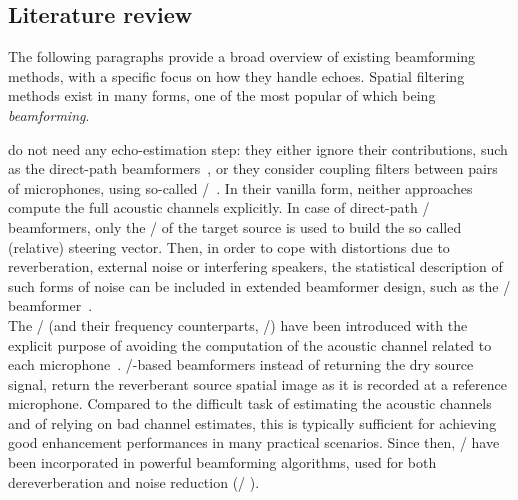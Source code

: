 \subsection{Literature review}
The following paragraphs provide a broad overview of existing beamforming methods, with a specific focus on how they handle echoes.
Spatial filtering methods exist in many forms, one of the most popular of which being \textit{beamforming}.

 do not need any echo-estimation step:
they either ignore their contributions, such as the direct-path beamformers~, or they consider coupling filters between pairs of microphones, using so-called \ReIRdef/~.
In their vanilla form, neither approaches compute the full acoustic channels explicitly.
In case of direct-path \DStxtdef/ beamformers, only the \DOA/ of the target source is used to build the so called (relative) steering vector.
Then, in order to cope with distortions due to reverberation, external noise or interfering speakers, the statistical description of such forms of noise can be included in extended beamformer design, such as the \MVDRtxt/ beamformer~.
\\The \ReIRs/ (and their frequency counterparts, \ReTFs/) have been introduced with the explicit purpose of avoiding the computation of the acoustic channel related to each microphone~.
\ReIRs/-based beamformers instead of returning the dry source signal, return the reverberant source spatial image as it is recorded at a reference microphone.
Compared to the difficult task of estimating the acoustic channels and of relying on bad channel estimates, this is typically sufficient for achieving good enhancement performances in many practical scenarios.
Since then, \ReIRs/ have been incorporated in powerful beamforming algorithms, used for both dereverberation and noise reduction (\eg/ ).

